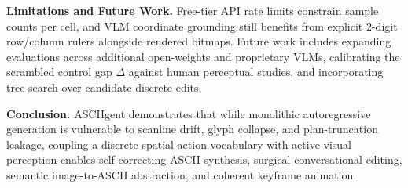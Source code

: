 \documentclass[10pt,twocolumn]{article}
\begin{document}
\textbf{Limitations and Future Work.}
Free-tier API rate limits constrain sample counts per cell, and VLM coordinate grounding still benefits from explicit 2-digit row/column rulers alongside rendered bitmaps. Future work includes expanding evaluations across additional open-weights and proprietary VLMs, calibrating the scrambled control gap $\Delta$ against human perceptual studies, and incorporating tree search over candidate discrete edits.

\textbf{Conclusion.}
ASCIIgent demonstrates that while monolithic autoregressive generation is vulnerable to scanline drift, glyph collapse, and plan-truncation leakage, coupling a discrete spatial action vocabulary with active visual perception enables self-correcting ASCII synthesis, surgical conversational editing, semantic image-to-ASCII abstraction, and coherent keyframe animation.

{\scriptsize


}
\end{document}

